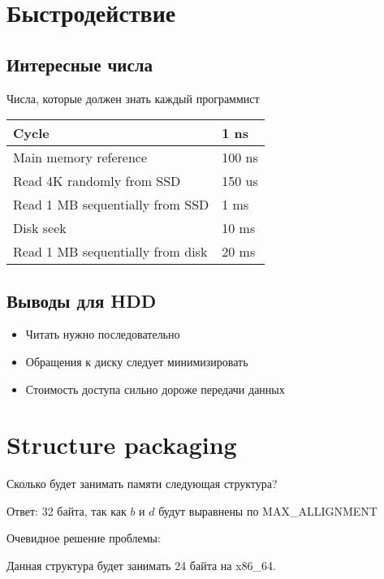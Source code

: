 \documentclass[../../lectures.tex]{subfiles}
\begin{document}
\section{Быстродействие}
\subsection{Интересные числа}
\begin{center}
Числа, которые должен знать каждый программист
\begin{tabular}{| l | l |}
    \hline
    Cycle                            & 1   ns \\ \hline
    Main memory reference            & 100 ns \\ \hline
    Read 4K randomly from SSD        & 150 us \\ \hline
    Read 1 MB sequentially from SSD  & 1   ms \\ \hline
    Disk seek                        & 10  ms \\ \hline
    Read 1 MB sequentially from disk & 20  ms \\ \hline
\end{tabular}
\end{center}
\subsection{Выводы для HDD}
\begin{itemize}
    \item Читать нужно последовательно
    \item Обращения к диску следует минимизировать
    \item Стоимость доступа сильно дороже передачи данных
\end{itemize}

\section{Structure packaging}
Сколько будет занимать памяти следующая структура?


Ответ: 32 байта, так как $b$ и $d$ будут выравнены по MAX\_ALLIGNMENT

Очевидное решение проблемы:


Данная структура будет занимать 24 байта на x86\_64.
\end{document}

